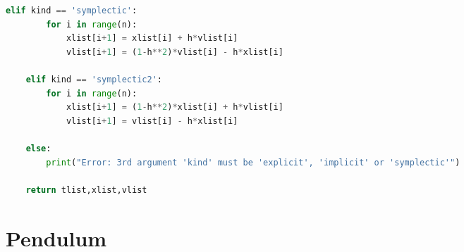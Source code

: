 \begin{adjustwidth*}{0cm}{-0.4cm}
\begin{lstlisting}[language=Python]
    elif kind == 'symplectic':
        for i in range(n):
            xlist[i+1] = xlist[i] + h*vlist[i]
            vlist[i+1] = (1-h**2)*vlist[i] - h*xlist[i]

    elif kind == 'symplectic2':
        for i in range(n):
            xlist[i+1] = (1-h**2)*xlist[i] + h*vlist[i]
            vlist[i+1] = vlist[i] - h*xlist[i]
    
    else:
        print("Error: 3rd argument 'kind' must be 'explicit', 'implicit' or 'symplectic'")
    
    return tlist,xlist,vlist
\end{lstlisting}
\end{adjustwidth*}

\section{Pendulum} \label{app:pe}
